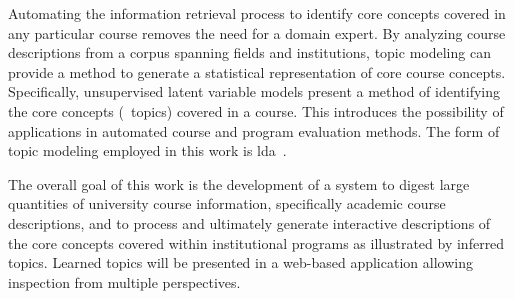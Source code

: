 
Automating the information retrieval process to identify core concepts covered in any particular course removes the need for a domain expert.
By analyzing course descriptions from a corpus spanning fields and institutions, topic modeling can provide a method to generate a statistical representation of core course concepts.
Specifically, unsupervised latent variable models present a method of identifying the core concepts (\ie\ topics) covered in a course.
This introduces the possibility of applications in automated course and program evaluation methods.
The form of topic modeling employed in this work is \acf{lda}~\cite{Blei2003}.


The overall goal of this work is the development of a system to digest large quantities of university course information, specifically academic course descriptions, and to process and ultimately generate interactive descriptions of the core concepts covered within institutional programs as illustrated by inferred topics.
Learned topics will be presented in a web-based application allowing inspection from multiple perspectives.


